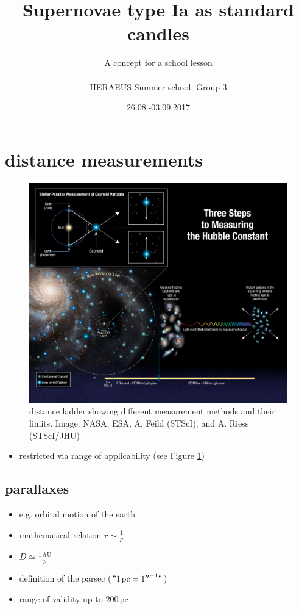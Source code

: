 \documentclass[a4paper, 11pt]{article}
\title{Supernovae type Ia as standard candles}
\author{A concept for a school lesson\\\\HERAEUS Summer school, Group 3}
\date{26.08.-03.09.2017}
\begin{document}
  \maketitle
  \tableofcontents
  \newpage
  \section{distance measurements}
    \begin{figure}
      \label{ladder}
      \includegraphics[width=\textwidth]{distanceladder.jpg}
      \caption{distance ladder showing different measurement methods and their limits. \hfill Image: NASA, ESA, A. Feild (STScI), and A. Riess (STScI/JHU)}
    \end{figure}
    \begin{itemize}
      \item restricted via range of applicability (see Figure \ref{ladder})
    \end{itemize}
    \subsection{parallaxes}
      \begin{itemize}
        \item e.g. orbital motion of the earth
        \item mathematical relation $r\sim\frac1p$
        \item $D\simeq\frac{1\,\mathrm{AU}}{p}$
        \item definition of the parsec ($"1\,\mathrm{pc}={1''}^{-1}"$)
        \item range of validity up to $200\,\mathrm{pc}$
      \end{itemize}
\end{document}
